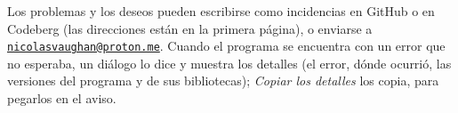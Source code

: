 \documentclass[12pt,
              article,
              oneside
              ]{memoir}
\newcommand*{\menu}[1]{\textit{#1}}
\begin{document}
\noindent{}%
Los problemas y los deseos pueden escribirse como incidencias en
GitHub o en Codeberg (las direcciones están en la primera página), o
enviarse a
\href{mailto:nicolasvaughan@proton.me}{\texttt{nicolasvaughan@proton.me}}.
Cuando el programa se encuentra con un error que no esperaba, un diálogo lo
dice y muestra los detalles (el error, dónde ocurrió, las versiones del
programa y de sus bibliotecas); \menu{Copiar los detalles} los copia, para
pegarlos en el aviso.

\printindex
\end{document}
